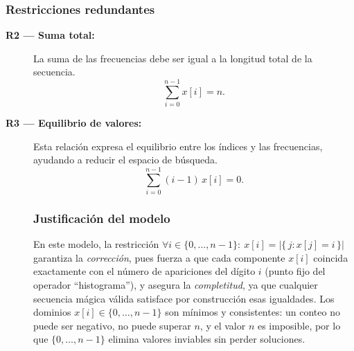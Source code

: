 \subsubsection*{Restricciones redundantes}
\begin{description}
  \item[\textbf{R2 — Suma total:}]La suma de las frecuencias debe ser igual a la longitud total de la secuencia.
  \[
  \sum_{i=0}^{n-1} x[i] = n.
  \]

  \item[\textbf{R3 — Equilibrio de valores:}]   Esta relación expresa el equilibrio entre los índices y las frecuencias, ayudando a reducir el espacio de búsqueda.
  \[
  \sum_{i=0}^{n-1} (i-1)\,x[i] = 0.
  \]

\subsubsection*{Justificación del modelo}
En este modelo, la restricción \(\forall i \in \{0,\dots,n-1\}:~ x[i] = \bigl|\{\,j : x[j]=i\,\}\bigr|\) garantiza la \emph{corrección}, pues fuerza a que cada componente \(x[i]\) coincida exactamente con el número de apariciones del dígito \(i\) (punto fijo del operador ``histograma''), y asegura la \emph{completitud}, ya que cualquier secuencia mágica válida satisface por construcción esas igualdades. Los dominios \(x[i]\in\{0,\dots,n-1\}\) son mínimos y consistentes: un conteo no puede ser negativo, no puede superar \(n\), y el valor \(n\) es imposible, por lo que \(\{0,\dots,n-1\}\) elimina valores inviables sin perder soluciones.
\end{description}